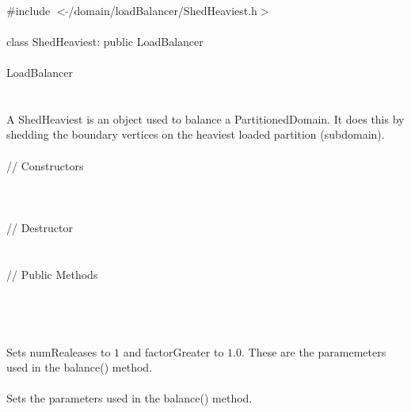 
   \\
\indent \#include $<\tilde{ }$/domain/loadBalancer/ShedHeaviest.h$>$  \\

  \\
\indent class ShedHeaviest: public LoadBalancer \\

 \\
\indent  LoadBalancer \\
\indent{} \\


  \\
\indent A ShedHeaviest is an object used to balance a
PartitionedDomain. It does this by shedding the boundary vertices on
the heaviest loaded partition (subdomain). \\

  \\
\indent\indent  // Constructors  \\
\indent{}\\ 
\indent{} \\ \\
\indent\indent // Destructor  \\
\indent{}  \\ \\
\indent\indent // Public Methods  \\
\indent{} \\ \\


\\
\\ 
Sets \p numRealeases to $1$ and  \p factorGreater to
$1.0$. These are the paramemeters used in the balance()
method. \\ 

 \\
Sets the parameters used in the balance() method. \\

